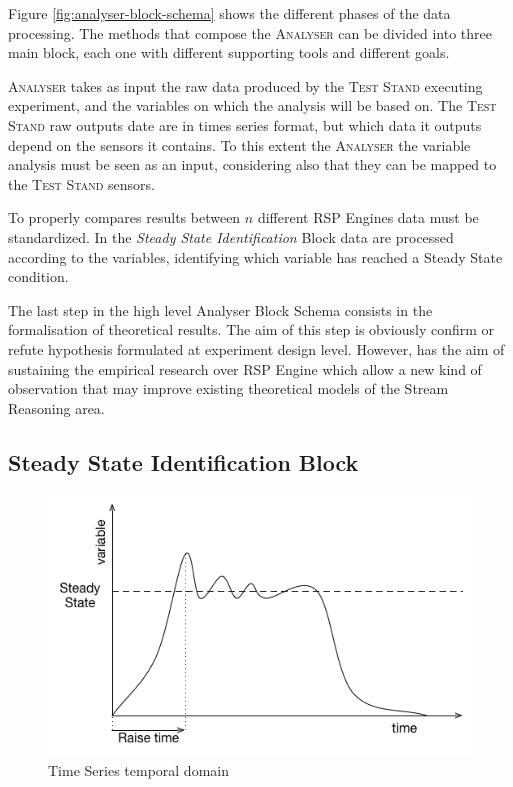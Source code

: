 Figure \ref{fig:analyser-block-schema} shows the different phases of the data processing. The methods that compose the \textsc{Analyser} can be divided into three main block, each one with different supporting tools and different goals.

\textsc{Analyser} takes as input the raw data produced by the \textsc{Test Stand} executing experiment, and the variables on which the analysis will be based on. The \textsc{Test Stand} raw outputs date are in times series format, but which data it outputs depend on the sensors it contains. To this extent the \textsc{Analyser} the variable analysis must be seen as an input, considering also that they can be mapped to the \textsc{Test Stand} sensors.

To properly compares results between $n$ different RSP Engines data must be standardized. In the \textit{Steady State Identification} Block data are processed according to the variables, identifying which variable has reached a Steady State condition.

The last step in the high level Analyser Block Schema consists in the formalisation of theoretical results. The aim of this step is obviously confirm or refute hypothesis formulated at experiment design level. However, \name has the aim of sustaining the empirical research over RSP Engine which allow a new kind of observation that may improve existing theoretical models of the Stream Reasoning area.



\subsection{Steady State Identification Block}\label{sec:analyser-ss-block}

\begin{figure}[tbh]
  \centering
	\includegraphics[width=0.5\linewidth]{images/steady-state}
	\caption{Time Series temporal domain} 	
  	\label{fig:steady-state}
\end{figure}


